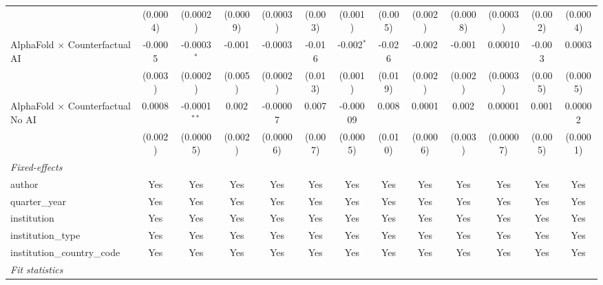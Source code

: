 \begin{tabular}{lcccccccccccc}
                                            & (0.0004)      & (0.0002)       & (0.0009) & (0.0003)     & (0.003)      & (0.001)       & (0.005) & (0.002)       & (0.0008) & (0.0003)  & (0.002) & (0.0004)\\   
   AlphaFold $\times$ Counterfactual AI     & -0.0005       & -0.0003$^{*}$  & -0.001   & -0.0003      & -0.016       & -0.002$^{*}$  & -0.026  & -0.002        & -0.001   & 0.00010   & -0.003  & 0.0003\\   
                                            & (0.003)       & (0.0002)       & (0.005)  & (0.0002)     & (0.013)      & (0.001)       & (0.019) & (0.002)       & (0.002)  & (0.0003)  & (0.005) & (0.0005)\\   
   AlphaFold $\times$ Counterfactual No AI  & 0.0008        & -0.0001$^{**}$ & 0.002    & -0.00007     & 0.007        & -0.00009      & 0.008   & 0.0001        & 0.002    & 0.00001   & 0.001   & 0.00002\\   
                                            & (0.002)       & (0.00005)      & (0.002)  & (0.00006)    & (0.007)      & (0.0005)      & (0.010) & (0.0006)      & (0.003)  & (0.00007) & (0.005) & (0.0001)\\   
   \midrule
   \emph{Fixed-effects}\\
   author                                   & Yes           & Yes            & Yes      & Yes          & Yes          & Yes           & Yes     & Yes           & Yes      & Yes       & Yes     & Yes\\  
   quarter\_year                            & Yes           & Yes            & Yes      & Yes          & Yes          & Yes           & Yes     & Yes           & Yes      & Yes       & Yes     & Yes\\  
   institution                              & Yes           & Yes            & Yes      & Yes          & Yes          & Yes           & Yes     & Yes           & Yes      & Yes       & Yes     & Yes\\  
   institution\_type                        & Yes           & Yes            & Yes      & Yes          & Yes          & Yes           & Yes     & Yes           & Yes      & Yes       & Yes     & Yes\\  
   institution\_country\_code               & Yes           & Yes            & Yes      & Yes          & Yes          & Yes           & Yes     & Yes           & Yes      & Yes       & Yes     & Yes\\  
   \midrule
   \emph{Fit statistics}\\

\end{tabular}
